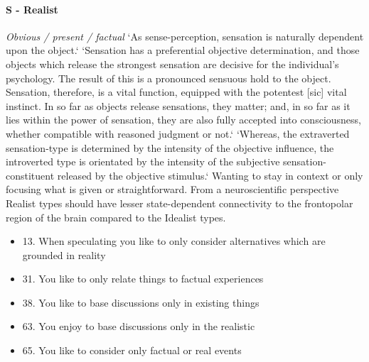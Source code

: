 \documentclass[11pt,a4paper]{article}
\begin{document}
\paragraph{S - Realist}
\emph{Obvious / present / factual}
`As sense-perception, sensation is naturally dependent upon the object.`\cite[p. 456]{jung1}
`Sensation has a preferential objective determination, and those objects which release the strongest sensation are decisive for the individual's psychology. The result of this is a pronounced sensuous hold to the object. Sensation, therefore, is a vital function, equipped with the potentest [sic] vital instinct. In so far as objects release sensations, they matter; and, in so far as it lies within the power of sensation, they are also fully accepted into consciousness, whether compatible with reasoned judgment or not.`\cite[p. 457]{jung1}
`Whereas, the extraverted sensation-type is determined by the intensity of the objective influence, the introverted type is orientated by the intensity of the subjective sensation-constituent released by the objective stimulus.`\cite[p. 501]{jung1}
Wanting to stay in context or only focusing what is given or straightforward.
From a neuroscientific perspective Realist types should have lesser state-dependent connectivity to the frontopolar region of the brain compared to the Idealist types.
\begin{itemize}
\item 13. When speculating you like to only consider alternatives which are grounded in reality
\item 31. You like to only relate things to factual experiences
\item 38. You like to base discussions only in existing things
\item 63. You enjoy to base discussions only in the realistic
\item 65. You like to consider only factual or real events
\end{itemize}
\end{document}
